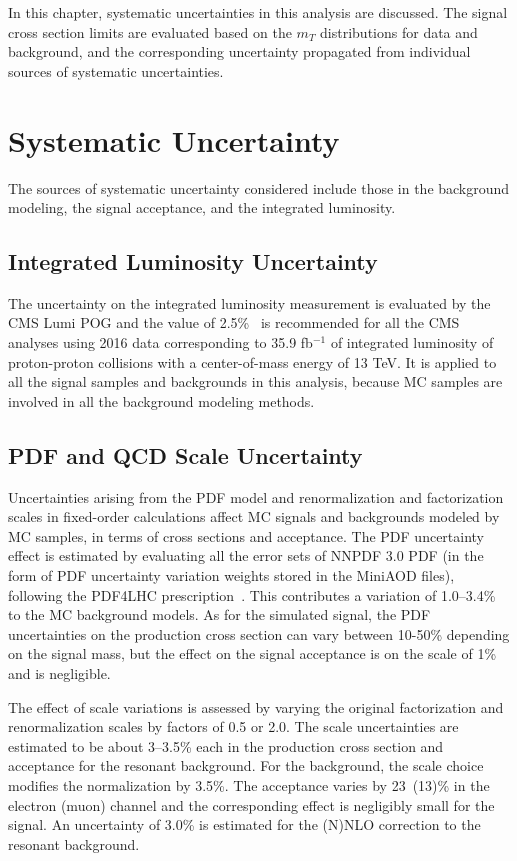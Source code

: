 In this chapter, systematic uncertainties in this analysis are discussed. The signal cross section limits are evaluated based on the $m_T$ distributions for data and background, and the corresponding uncertainty propagated from individual sources of systematic uncertainties.
\section{Systematic Uncertainty}
The sources of systematic uncertainty considered include those in the background modeling, the signal acceptance, and the integrated luminosity.
\subsection{Integrated Luminosity Uncertainty}
The uncertainty on the integrated luminosity measurement is evaluated by the CMS Lumi POG and the value of 2.5\%~\cite{sys_lumi} is recommended for all the CMS analyses using 2016 data corresponding to 35.9 fb$^{-1}$ of integrated luminosity of proton-proton collisions with a center-of-mass energy of 13 TeV. It is applied to all the signal samples and backgrounds in this analysis, because MC samples are involved in all the background modeling methods.
\subsection{PDF and QCD Scale Uncertainty}
Uncertainties arising from the PDF model and renormalization and factorization scales in fixed-order calculations affect MC signals and backgrounds modeled by MC samples, in terms of cross sections and acceptance. The PDF uncertainty effect is estimated by evaluating all the error sets of NNPDF 3.0 PDF (in the form of PDF uncertainty variation weights stored in the MiniAOD files), following the PDF4LHC prescription~\cite{sample_pdf4lhc}. This contributes a variation of 1.0--3.4\% to the MC background models. As for the simulated signal, the PDF uncertainties on the production cross section can vary between 10-50\% depending on the signal mass, but the effect on the signal acceptance is on the scale of 1\% and is negligible.

\vspace{0.3cm}
The effect of scale variations is assessed by varying the original factorization and renormalization scales by factors of 0.5 or 2.0. The scale uncertainties are estimated to be about 3--3.5\% each in the production cross section and acceptance for the resonant background. For the \Zjets background, the scale choice modifies the normalization by 3.5\%. The acceptance varies by 23~(13)\% in the electron (muon) channel and the corresponding effect is negligibly small for the signal.  An uncertainty of 3.0\% is estimated for the (N)NLO correction to the resonant background.

